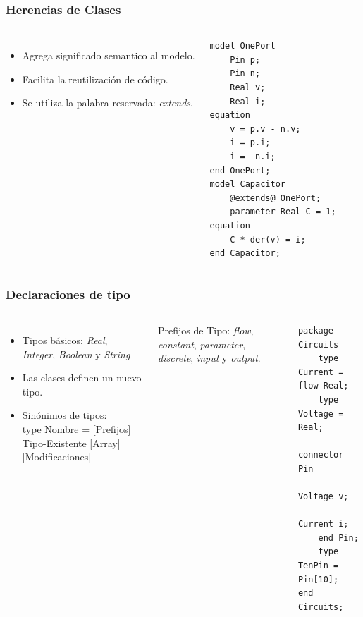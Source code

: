 \documentclass[aspectratio=169,10pt]{beamer}
\begin{document}
\begin{frame}[fragile]
\frametitle{Herencias de Clases} 
\begin{columns}  

\begin{itemize}
    \item Agrega significado semantico al modelo.
    \item Facilita la reutilizaci\'on de c\'odigo.
    \item Se utiliza la palabra reservada: \textit{extends}.
\end{itemize} 

\begin{lstlisting}[style=base]
model OnePort
    Pin p;
    Pin n;
    Real v;
    Real i;
equation
    v = p.v - n.v;
    i = p.i;
    i = -n.i;
end OnePort;
model Capacitor
    @extends@ OnePort;
    parameter Real C = 1;
equation
    C * der(v) = i;
end Capacitor;
\end{lstlisting}
\end{columns}
\end{frame}

\begin{frame}[fragile]
\frametitle{Declaraciones de tipo} 
\begin{columns}  
\column[t]{8cm}
    \begin{itemize}
        \item Tipos b\'asicos: \textit{Real}, \textit{Integer}, \textit{Boolean} y \textit{String}
        \item Las clases definen un nuevo tipo.
        \item Sin\'onimos de tipos: \\ 
              type Nombre = [Prefijos] Tipo-Existente [Array] [Modificaciones]
    \end{itemize} 

Prefijos de Tipo: \textit{flow}, \textit{constant}, \textit{parameter}, \textit{discrete}, \textit{input} y \textit{output}.

\column[t]{5cm}
\begin{lstlisting}[style=base]
package Circuits
    type Current = flow Real;
    type Voltage = Real;
    connector Pin
        Voltage v;
        Current i;
    end Pin;
    type TenPin = Pin[10];
end Circuits;
\end{lstlisting}
\par
\end{columns}
\end{frame}
\end{document}

